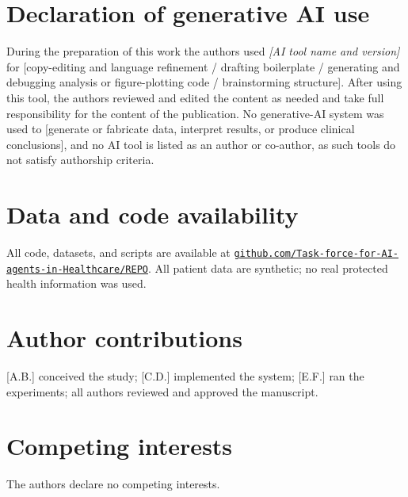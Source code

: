 \documentclass[11pt]{article}
\begin{document}
\section*{Declaration of generative AI use}
During the preparation of this work the authors used %
\emph{[AI tool name and version]} for %
[copy-editing and language refinement / drafting boilerplate / generating and
debugging analysis or figure-plotting code / brainstorming structure].
After using this tool, the authors reviewed and edited the content as needed and take
full responsibility for the content of the publication. No generative-AI system was
used to %
[generate or fabricate data, interpret results, or produce clinical conclusions], and
no AI tool is listed as an author or co-author, as such tools do not satisfy authorship
criteria.

\section*{Data and code availability}
All code, datasets, and scripts are available at
\href{https://github.com/Task-force-for-AI-agents-in-Healthcare/REPO}{\nolinkurl{github.com/Task-force-for-AI-agents-in-Healthcare/REPO}}.
All patient data are synthetic; no real protected health information was used.

\section*{Author contributions}
[A.B.] conceived the study; [C.D.] implemented the system; [E.F.] ran the experiments;
all authors reviewed and approved the manuscript.

\section*{Competing interests}
The authors declare no competing interests.
\end{document}
